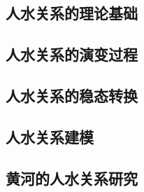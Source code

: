\subsection{人水关系的理论基础}\label{ch1:sec:theories}


\subsection{人水关系的演变过程}\label{ch1:sec:process}


\subsection{人水关系的稳态转换}\label{ch1:sec:mechanism}


\subsection{人水关系建模}\label{ch1:sec:model}


\subsection{黄河的人水关系研究}\label{ch1:sec:yellow_river}
